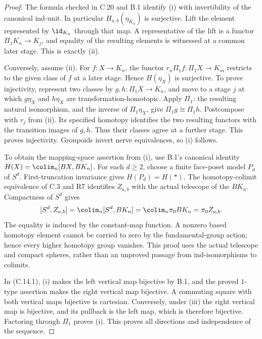 \begin{proof}
The formula checked in C.20 and B.1 identify (i) with invertibility of the canonical ind-unit. In particular $H_{a,b}(\eta_{K_n})$ is surjective. Lift the element represented by $\id_{K_n}$ through that map. A representative of the lift is a functor $\Pi_1K_n\to K_j$, and equality of the resulting elements is witnessed at a common later stage. This is exactly (ii).

Conversely, assume (ii). For $f:X\to K_n$, the functor $r_n\Pi_1f:\Pi_1X\to K_m$ restricts to the given class of $f$ at a later stage. Hence $H(\eta_X)$ is surjective. To prove injectivity, represent two classes by $g,h:\Pi_1X\to K_n$, and move to a stage $j$ at which $g\eta_X$ and $h\eta_X$ are transformation-homotopic. Apply $\Pi_1$: the resulting natural isomorphism, and the inverse of $\Pi_1\eta_X$, give $\Pi_1g\cong\Pi_1h$. Postcompose with $r_j$ from (ii). Its specified homotopy identifies the two resulting functors with the transition images of $g,h$. Thus their classes agree at a further stage. This proves injectivity. Groupoids invert nerve equivalences, so (i) follows.

To obtain the mapping-space assertion from (i), use B.1's canonical identity $H(X)=\colim_n[BX,BK_n]$. For each $d\geq2$, choose a finite face-poset model $P_d$ of $S^d$. First-truncation invariance gives $H(P_d)=H(*)$. The homotopy-colimit equivalence of C.3 and R7 identifies $Z_{a,b}$ with the actual telescope of the $BK_n$. Compactness of $S^d$ gives
\[
 [S^d,Z_{a,b}]=\colim_n[S^d,BK_n]=\colim_n\pi_0BK_n=\pi_0Z_{a,b}.
\]
The equality is induced by the constant-map function. A nonzero based homotopy element cannot be carried to zero by the fundamental-group action; hence every higher homotopy group vanishes. This proof uses the actual telescope and compact spheres, rather than an unproved passage from ind-isomorphisms to colimits.

In (C.14.1), (i) makes the left vertical map bijective by B.1, and the proved $1$-type assertion makes the right vertical map bijective. A commuting square with both vertical maps bijective is cartesian. Conversely, under (iii) the right vertical map is bijective, and its pullback is the left map, which is therefore bijective. Factoring through $\Pi_1$ proves (i). This proves all directions and independence of the sequence.
\end{proof}

